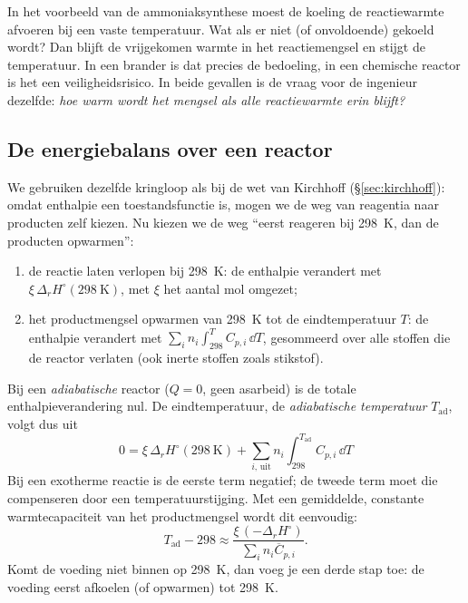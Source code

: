In het voorbeeld van de ammoniaksynthese moest de koeling de reactiewarmte afvoeren bij een vaste temperatuur. Wat als er niet (of onvoldoende) gekoeld wordt? Dan blijft de vrijgekomen warmte in het reactiemengsel en stijgt de temperatuur. In een brander is dat precies de bedoeling, in een chemische reactor is het een veiligheidsrisico. In beide gevallen is de vraag voor de ingenieur dezelfde: \emph{hoe warm wordt het mengsel als alle reactiewarmte erin blijft?}

\subsection{De energiebalans over een reactor}

We gebruiken dezelfde kringloop als bij de wet van Kirchhoff (\S\ref{sec:kirchhoff}): omdat enthalpie een toestandsfunctie is, mogen we de weg van reagentia naar producten zelf kiezen. Nu kiezen we de weg ``eerst reageren bij \SI{298}{\kelvin}, dan de producten opwarmen'':
\begin{enumerate}
\item de reactie laten verlopen bij \SI{298}{\kelvin}: de enthalpie verandert met $\xi\,\Delta_r H^\circ(\SI{298}{\kelvin})$, met $\xi$ het aantal mol omgezet;
\item het productmengsel opwarmen van \SI{298}{\kelvin} tot de eindtemperatuur $T$: de enthalpie verandert met $\sum_i n_i \int_{298}^{T} C_{p,i}\,\dd T$, gesommeerd over alle stoffen die de reactor verlaten (ook inerte stoffen zoals stikstof).
\end{enumerate}
Bij een \emph{adiabatische} reactor ($Q = 0$, geen asarbeid) is de totale enthalpieverandering nul. De eindtemperatuur, de \emph{adiabatische temperatuur} $T_\mathrm{ad}$, volgt dus uit
\begin{equation}
\boxed{\;0 = \xi\,\Delta_r H^\circ(\SI{298}{\kelvin}) + \sum_{i,\,\mathrm{uit}} n_i \int_{298}^{T_\mathrm{ad}} C_{p,i}\,\dd T\;}
\label{eq:adiabatische-temperatuur}
\end{equation}
Bij een exotherme reactie is de eerste term negatief; de tweede term moet die compenseren door een temperatuurstijging. Met een gemiddelde, constante warmtecapaciteit van het productmengsel wordt dit eenvoudig:
\begin{equation}
T_\mathrm{ad} - 298 \approx \frac{\xi\,(-\Delta_r H^\circ)}{\sum_i n_i \overline{C}_{p,i}}.
\label{eq:adiabatische-temperatuur-cp}
\end{equation}
Komt de voeding niet binnen op \SI{298}{\kelvin}, dan voeg je een derde stap toe: de voeding eerst afkoelen (of opwarmen) tot \SI{298}{\kelvin}.

